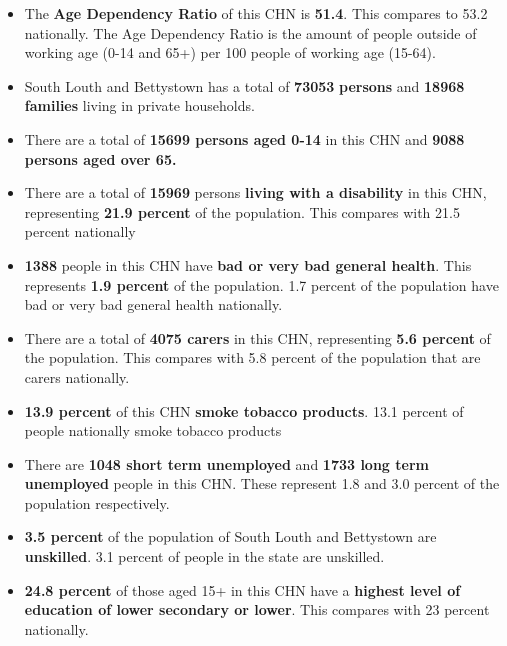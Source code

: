 \documentclass{article}
\begin{document}
\begin{itemize}

\item The \textbf{Age Dependency Ratio} of this CHN is  \textbf{51.4}. This compares to 53.2 nationally. The Age Dependency Ratio is the amount of people outside of working age (0-14 and 65+) per 100 people of working age (15-64). 

\item South Louth and Bettystown has a total of \textbf{\num{73053}} \textbf{persons} and  \textbf{\num{18968}} \textbf{families} living in private households.

\item There are a total of \textbf{\num{15699} persons aged 0-14} in this CHN and \textbf{\num{9088} persons aged over 65.} 

\item There are a total of \textbf{\num{15969}} persons \textbf{living with a disability} in this CHN, representing \textbf{21.9 percent} of the population. This compares with  21.5 percent nationally

\item \textbf{\num{1388}} people in this CHN have \textbf{bad or very bad general health}. This represents \textbf{1.9 percent} of the population. 1.7 percent of the population have bad or very bad general health nationally. 

\item There are a total of \textbf{\num{4075} carers} in this CHN, representing \textbf{5.6 percent} of the population. This compares with 5.8 percent of the population that are carers nationally. 

\item \textbf{13.9 percent} of this CHN \textbf{smoke tobacco products}. 13.1 percent of people nationally smoke tobacco products

\item There are \textbf{\num{1048} short term unemployed} and \textbf{\num{1733} long term unemployed} people in this CHN. These represent 1.8 and 3.0 percent of the population respectively.

\item  \textbf{3.5 percent} of the population of South Louth and Bettystown are \textbf{unskilled}. 3.1 percent of people in the state are unskilled.

\item \textbf{24.8 percent} of those aged 15+ in this CHN have a \textbf{highest level of education of lower secondary or lower}. This compares with 23 percent nationally. 


\end{itemize}
\end{document}
